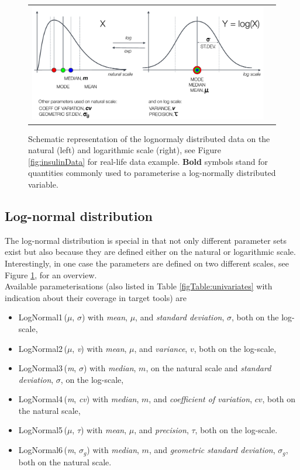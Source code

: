 {\begin{figure}[htb!]
\centering
\begin{tabular}{cc}
 \includegraphics[width=160mm]{pics/LogNormalNormalSchema}
\end{tabular}
\caption{Schematic representation of the lognormaly distributed data on the natural (left) 
and logarithmic scale (right), see Figure \ref{fig:insulinData} for real-life data example. 
\textbf{Bold} symbols stand for quantities commonly used to parameterise a log-normally 
distributed variable.}
\label{fig:schematicLogNormal}
\end{figure}

\subsection{Log-normal distribution}
\label{subsec:logNormalForms}
The log-normal distribution is special in that not only different parameter sets exist
but also because they are defined either on the natural or logarithmic scale. Interestingly, in one 
case the parameters are defined on two different scales, see Figure \ref{fig:schematicLogNormal},
for an overview.\\
Available parameterisations (also listed in Table \ref{figTable:univariates} 
with indication about their coverage in target tools) are 
\begin{itemize}
\item
LogNormal1\,($\mu$, $\sigma$) with \emph{mean}, $\mu$, and \emph{standard deviation}, $\sigma$, both on the log-scale, 
\item
LogNormal2\,($\mu$, \textit{v}) with \emph{mean}, $\mu$, and \emph{variance}, $v$, both on the log-scale, 
\item
LogNormal3\,(\textit{m}, $\sigma$)  with \emph{median}, $m$, on the natural scale and \emph{standard deviation}, $\sigma$, on the log-scale, 
\item
LogNormal4\,(\textit{m}, \textit{cv}) with \emph{median}, $m$, and \emph{coefficient of variation}, $cv$, both on the natural scale, 
\item
LogNormal5\,($\mu$, $\tau$) with \emph{mean}, $\mu$, and \emph{precision}, $\tau$, both on the log-scale.
\item
LogNormal6\,(\textit{m}, $\sigma_g$)  with \emph{median}, $m$, and \emph{geometric standard deviation}, $\sigma_g$, both on the natural scale.
\end{itemize}

}
